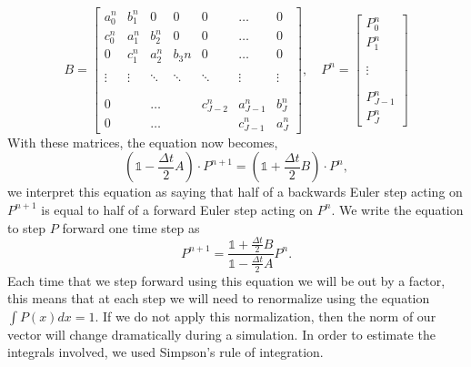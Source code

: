 \begin{equation}
B =
\begin{bmatrix}
	a_0^{n} & b_1^{n}     & 0                 & 0          & 0                    & \dots            & 0        \\
	c_0^{n} & a_1^{n}     & b_2^{n}      & 0          & 0                    & \dots            & 0        \\
	0                & c_1^{n} & a_2^{n}      & b_3{n} & 0                    & \dots            & 0        \\
			     &               &                   &             &                      &                     &           \\
	\vdots         & \vdots     & \ddots         & \ddots   & \ddots            & \vdots           & \vdots \\
			     &               &                   &             &                      &                     &           \\
			     &               &                   &             &                      &                     &           \\
	0                &               & \dots           &             &  c_{J-2}^{n} & a_{J-1}^{n}  & b_J^{n} \\
	0                &               & \dots           &             &                     &  c_{J-1}^{n} & a_J^{n}
\end{bmatrix}
,\quad P^{n} =
\begin{bmatrix}
P_0^{n}       \\
P_1^n          \\
                    \\
                    \\
\vdots           \\
                    \\
                    \\
P_{J-1}^{n} \\
P_J^{n}
\end{bmatrix}
\end{equation}
With these matrices, the equation now becomes,
\begin{equation}
\left (\mathbb{1} - \frac{\Delta t}{2}A \right) \cdot P^{n+1} = \left (\mathbb{1} + \frac{\Delta t}{2}B \right) \cdot P^n,
\end{equation}
we interpret this equation as saying that half of a backwards Euler step acting on $P^{n+1}$ is equal to half of a forward Euler step acting on $P^n$. We write the equation to step $P$ forward one time step as
\begin{equation}
P^{n+1} = \frac{\mathbb{1} + \frac{\Delta t}{2}B}{\mathbb{1} - \frac{\Delta t}{2}A} P^n.
\end{equation}
Each time that we step forward using this equation we will be out by a factor, this means that at each step we will need to renormalize using the equation $\int P(x) dx = 1$. If we do not apply this normalization, then the norm of our vector will change dramatically during a simulation. In order to estimate the integrals involved, we used Simpson's rule of integration.

